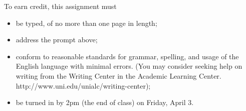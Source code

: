 \documentclass[12pt,letterpaper]{article}
\begin{document}
To earn credit, this assignment must
\begin{itemize}
\item be typed, of no more than one page in length;
\item address the prompt above;
\item conform to reasonable standards for grammar, spelling, and usage of the English language with minimal errors. (You may consider seeking help on writing from the Writing Center in the Academic Learning Center. http://www.uni.edu/unialc/writing-center);
\item be turned in by 2pm (the end of class) on Friday, April 3.
\end{itemize}
\end{document}
